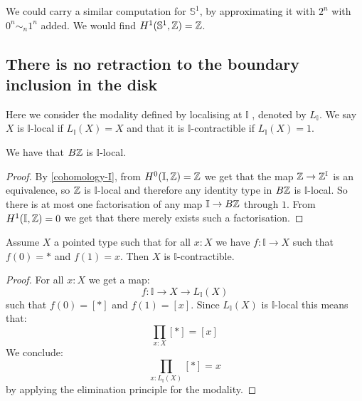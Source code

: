\begin{remark}
We could carry a similar computation for $\mathbb{S}^1$, by approximating it with $2^n$ with $0^n\sim_n1^n$ added. We would find $H^1(\mathbb{S}^1,\mathbb{Z})=\mathbb{Z}$.
\end{remark}


\subsection{There is no retraction to the boundary inclusion in the disk}


Here we consider the modality defined by localising at $\mathbb{I}$ \cite{modalities}, denoted by $L_\mathbb{I}$. We say $X$ is $\mathbb{I}$-local if $L_\mathbb{I}(X) = X$ and that it is $\mathbb{I}$-contractible if $L_\mathbb{I}(X)=1$.

\begin{lemma}\label{BZ-I-local}
We have that $B\mathbb{Z}$ is $\mathbb{I}$-local.
\end{lemma}

\begin{proof}
By \cref{cohomology-I}, from $H^0(\mathbb{I},\mathbb{Z})=\mathbb{Z}$ we get that the map $\mathbb{Z}\to \mathbb{Z}^\mathbb{I}$ is an equivalence, so $\mathbb{Z}$ is $\mathbb{I}$-local and therefore any identity type in $B\mathbb{Z}$ is $\mathbb{I}$-local. So there is at most one factorisation of any map $\mathbb{I}\to B\mathbb{Z}$ through $1$. From $H^1(\mathbb{I},\mathbb{Z})=0$ we get that there merely exists such a factorisation.
\end{proof}

\begin{lemma}\label{continuously-path-connected-contractible}
Assume $X$ a pointed type such that for all $x:X$ we have $f:\mathbb{I}\to X$ such that $f(0)=*$ and $f(1)=x$. Then $X$ is $\mathbb{I}$-contractible.
\end{lemma}

\begin{proof}
For all $x:X$ we get a map:
\[f:\mathbb{I}\to X\to L_\mathbb{I}(X)\]
such that $f(0) = [*]$ and $f(1)=[x]$. Since $L_\mathbb{I}(X)$ is $\mathbb{I}$-local this means that:
\[\prod_{x:X}[*]=[x]\]
We conclude:
\[\prod_{x:L_\mathbb{I}(X)}[*]=x\]
by applying the elimination principle for the modality.
\end{proof}

